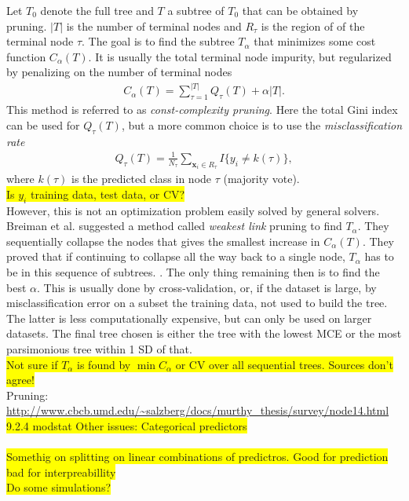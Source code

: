 Let $T_0$ denote the full tree and $T$ a subtree of $T_0$ that can be obtained by pruning. $|T|$ is the number of terminal nodes and $R_{\tau}$ is the region of of the terminal node $\tau$. The goal is to find the subtree $T_\alpha$ that minimizes some cost function $C_\alpha (T)$. It is usually the total terminal node impurity, but regularized by penalizing on the number of terminal nodes
\begin{align}
  C_\alpha (T) = \sum_{\tau = 1}^{|T|} Q_\tau (T) + \alpha |T|. 
\end{align}
This method is referred to as \textit{const-complexity pruning}.
Here the total Gini index can be used for $Q_\tau (T)$, but a more common choice is to use the \textit{misclassification rate} 
\begin{align}
  Q_\tau (T) =  \frac{1}{N_{\tau}} \sum_{\mathbf{x}_i \in R_{\tau}} I\{y_i \neq k(\tau)\},
\end{align}
where $k(\tau)$ is the predicted class in node $\tau$ (majority vote).
\\ \colorbox{yellow}{Is $y_i$ training data, test data, or CV?} \\
However, this is not an optimization problem easily solved by general solvers. Breiman et al. \cite{breiman} suggested a method called \textit{weakest link} pruning to find $T_\alpha$. They sequentially collapse the nodes that gives the smallest increase in $C_\alpha(T)$.
They proved that if continuing to collapse all the way back to a single node, $T_\alpha$ has to be in this sequence of subtrees.  . The only thing remaining then is to find the best $\alpha$. This is usually done by cross-validation, or, if the dataset is large, by misclassification error on a subset the training data, not used to build the tree. The latter is less computationally expensive, but can only be used on larger datasets. The final tree chosen is either the tree with the lowest MCE or the most parsimonious tree within 1 SD of that.
\\ \colorbox{yellow}{Not sure if $T_\alpha$ is found by $\min C_\alpha$ or CV over all sequential trees. Sources don't agree!}
\\ Pruning: \url{http://www.cbcb.umd.edu/~salzberg/docs/murthy_thesis/survey/node14.html}\\
\colorbox{yellow}{9.2.4 modstat Other issues: Categorical predictors} \\ \\
%
\colorbox{yellow}{Somethig on splitting on linear combinations of predictros. Good for prediction bad for interpreabillity}\\
\colorbox{yellow}{Do some simulations?}

